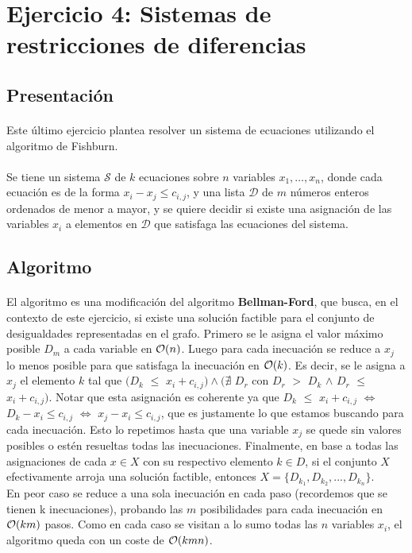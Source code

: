 \documentclass[../main.tex]{subfiles}
\begin{document}
\section{Ejercicio 4: Sistemas de restricciones de diferencias}

\subsection{Presentación}
\label{sec:ej4-intro}
\paragraph{} Este último ejercicio plantea resolver un sistema de ecuaciones utilizando el algoritmo de Fishburn.

\paragraph{} Se tiene un sistema \(\mathcal{S}\) de \(k\) ecuaciones sobre \(n\) variables \(x_{1}, \ldots, x_{n}\), donde cada ecuación es de la forma \(x_{i} - x_{j} \leq c_{i,j}\), y una lista \(\mathcal{D}\) de \(m\) números enteros ordenados de menor a mayor, y se quiere decidir si existe una asignación de las variables \(x_{i}\) a elementos en \(\mathcal{D}\) que satisfaga las ecuaciones del sistema.

\subsection{Algoritmo}
\label{sec:ej4-algo}
\paragraph{} El algoritmo es una modificación del algoritmo \textbf{Bellman-Ford}, que busca, en el contexto de este ejercicio, si existe una soluci\'on factible para el conjunto de desigualdades representadas en el grafo. Primero se le asigna el valor máximo posible \(D_{m}\) a cada variable en \(\mathcal{O}(n)\). Luego para cada inecuación se reduce a \(x_{j}\) lo menos posible para que satisfaga la inecuación en \(\mathcal{O}(k)\). Es decir, se le asigna a $x_j$ el elemento $k$ tal que $(D_k$ $\leq$ $x_i + c_{i,j}) \land (\nexists$ $D_r$ con $D_r$ $>$ $D_k$ $\land$ $D_r$ $\leq$ $x_i + c_{i,j})$. Notar que esta asignaci\'on es coherente ya que $D_k$ $\leq$ $x_i + c_{i,j}$ $\iff$ $D_k - x_i \leq c_{i,j}$ $\iff$ $x_j - x_i \leq c_{i,j}$, que es justamente lo que estamos buscando para cada inecuaci\'on. Esto lo repetimos hasta que una variable \(x_{j}\) se quede sin valores posibles o estén resueltas todas las inecuaciones. Finalmente, en base a todas las asignaciones de cada $x \in X$ con su respectivo elemento $k \in D$, si el conjunto $X$ efectivamente arroja una soluci\'on factible, entonces $X = \lbrace D_{k_1}, D_{k_2}, ..., D_{k_n} \rbrace$. \\
En peor caso se reduce a una sola inecuación en cada paso (recordemos que se tienen k inecuaciones), probando las \(m\) posibilidades para cada inecuación en \(\mathcal{O}(km)\) pasos. Como en cada caso se visitan a lo sumo todas las $n$ variables $x_i$, el algoritmo queda con un coste de \(\mathcal{O}(kmn)\).
\end{document}
